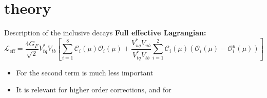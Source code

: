 \documentclass[xcolor=dvipsnames]{beamer}
\begin{document}

\section{\safeBtoXsgamma theory}

\begin{frame}{Description of the inclusive \BtoXsgamma decays}
   \scriptsize
   \textbf{Full effective Lagrangian:}
      \begin{equation}\nonumber
         \mathcal{L}_{\mathrm{eff}} = \frac{4G_F}{\sqrt{2}}V_{tq}^*V_{tb}\left[\sum^{8}_{i=1}\mathcal{C}_i(\mu)\mathcal{O}_i(\mu)
                                                     + \frac{V^*_{uq}V_{ub}}{V^*_{tq}V_{tb}}\sum^{2}_{i=1}\mathcal{C}_i(\mu)(\mathcal{O}_i(\mu)-\mathcal{O}_i^u(\mu))\right]
      \end{equation}
   
   \begin{itemize}
      \item For \btosgamma the second term is much less important
      \item It is relevant for higher order corrections, and for \btodgamma
   \end{itemize}
  
\end{frame}
\end{document}
